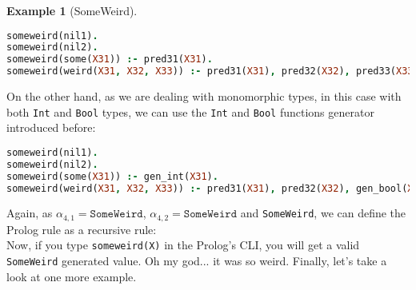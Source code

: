 \documentclass{report}
\theoremstyle{definition}
\newtheorem{example}{Example}[section]
\theoremstyle{definition}
\newcommand{\ttt}[1]{\texttt{#1}}
\begin{document}
\begin{example}[SomeWeird]
	\begin{lstlisting}[language=Prolog]
someweird(nil1).																														%% rule 1
someweird(nil2).																														%% rule 2
someweird(some(X31)) :- pred31(X31).																				%% rule 3
someweird(weird(X31, X32, X33)) :- pred31(X31), pred32(X32), pred33(X33).		%% rule 4
	\end{lstlisting}
	On the other hand, as we are dealing with monomorphic types, in this case with both \ttt{Int} and \ttt{Bool} types, we can use the \ttt{Int} and \ttt{Bool} functions generator introduced before:\\
	\begin{lstlisting}[language=Prolog]
someweird(nil1).																														%% rule 1
someweird(nil2).																														%% rule 2
someweird(some(X31)) :- gen_int(X31).																				%% rule 3
someweird(weird(X31, X32, X33)) :- pred31(X31), pred32(X32), gen_bool(X33).	%% rule 4
	\end{lstlisting}
	Again, as $\alpha_{4,1} = \ttt{SomeWeird}$, $\alpha_{4,2} = \ttt{SomeWeird}$ and \ttt{SomeWeird}, we can define the Prolog rule as a recursive rule:\\
	
	Now, if you type \ttt{someweird(X)} in the Prolog's CLI, you will get a valid \ttt{SomeWeird} generated value. Oh my god... it was so weird. Finally, let's take a look at one more example.\\
\end{example}
\end{document}

